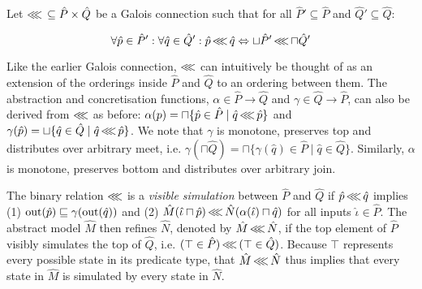 



Let $\operatorname{\lll} \, \subseteq \hat P \times \hat Q$ be a Galois connection such that for all $\hat P' \subseteq \hat P$ and $\hat Q' \subseteq \hat Q$:

\begin{equation*}
\forall \hat p \in \hat P' : \forall \hat q \in \hat Q' : \hat p \operatorname{\lll} \hat q \Leftrightarrow \sqcup \hat P' \operatorname{\lll} \sqcap \hat Q'
\end{equation*}

\noindent Like the earlier Galois connection, $\operatorname{\lll}$ can intuitively be thought of as an extension of the orderings inside $\hat P$ and $\hat Q$ to an ordering between them. The abstraction and concretisation functions, $\alpha \in \hat P \rightarrow \hat Q$ and $\gamma \in \hat Q \rightarrow \hat P$, can also be derived from $\operatorname{\lll}$ as before: $\alpha(p) = \sqcap \{ \hat p \in \hat P \mid \hat q \operatorname{\lll} \hat p \}$ and $\gamma(\hat p) = \sqcup \{ \hat q \in \hat Q \mid \hat q \operatorname{\lll} \hat p \}$. We note that $\gamma$ is monotone, preserves top and distributes over arbitrary meet, i.e. $\gamma(\sqcap \hat Q) = \sqcap \{ \gamma(\hat q) \in \hat P \mid \hat q \in \hat Q\}$. Similarly, $\alpha$ is monotone, preserves bottom and distributes over arbitrary join.

The binary relation $\operatorname{\lll}$ is a \textit{visible simulation} between $\hat P$ and $\hat Q$ if $\hat p \operatorname{\lll} \hat q$ implies (1) $\operatorname{out}(\hat p) \sqsubseteq \gamma(\operatorname{out}(\hat q))$ and (2) $\hat M(\hat \iota \sqcap \hat p) \operatorname{\lll} \hat N(\alpha(\hat \iota) \sqcap \hat q)$ for all inputs $\hat \iota \in \hat P$. The abstract model $\hat M$ then refines $\hat N$, denoted by $\hat M \operatorname{\lll} \hat N$, if the top element of $\hat P$ visibly simulates the top of $\hat Q$, i.e. $(\top \in \hat P) \operatorname{\lll} \, (\top \in \hat Q)$. Because $\top$ represents every possible state in its predicate type, that $\hat M \operatorname{\lll} \hat N$ thus implies that every state in $\hat M$ is simulated by every state in $\hat N$. 

